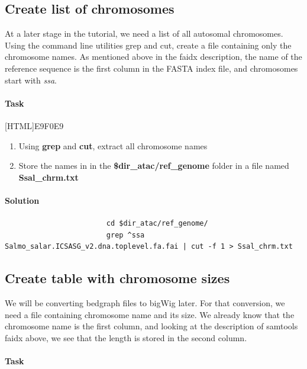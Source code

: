 \documentclass[12pt]{article}
\begin{document}
		\subsection{Create list of chromosomes}	
			At a later stage in the tutorial, we need a list of all autosomal chromosomes. 
			Using the command line utilities grep and cut, create a file containing only the chromosome names. 
			As mentioned above in the faidx description, the name of the reference sequence is the first column in the FASTA index file, and chromosomes start with \textit{ssa}.

			\paragraph{Task}
		
				[HTML]{E9F0E9}{\parbox{\linewidth}{%
						\begin{enumerate}
							\item Using \textbf{grep} and \textbf{cut}, extract all chromosome names
							\item Store the names in in the \textbf{\$dir\_atac/ref\_genome} folder in a file named \textbf{Ssal\_chrm.txt}
						\end{enumerate}
				}}
			
			\paragraph{Solution}
			
				\begin{minipage}{\linewidth}
					\begin{lstlisting}
						cd $dir_atac/ref_genome/
						grep ^ssa Salmo_salar.ICSASG_v2.dna.toplevel.fa.fai | cut -f 1 > Ssal_chrm.txt
					\end{lstlisting}
				\end{minipage}
		
		\subsection{Create table with chromosome sizes}
			We will be converting bedgraph files to bigWig later. 
			For that conversion, we need a file containing chromosome name and its size. 
			We already know that the chromosome name is the first column, and looking at the description of samtools faidx above, we see that the length is stored in the second column.
			 
			\paragraph{Task}
			
\end{document}
